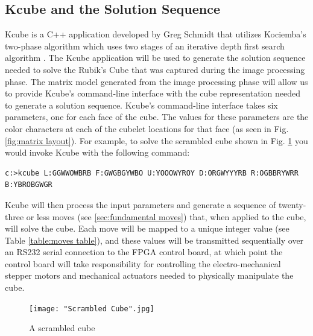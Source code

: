 \documentclass[final, letterpaper, 10 pt, conference, onecolumn]{IEEEtran}
\begin{document}
\subsection{Kcube and the Solution Sequence}
\label{sec:Kcube}
Kcube is a C++ application developed by Greg Schmidt that utilizes Kociemba's two-phase algorithm which uses two stages of an iterative depth first search algorithm \cite{The Two-Phase Algorithm}. The Kcube application will be used to generate the solution sequence needed to solve the Rubik's Cube that was captured during the image processing phase. The matrix model generated from the image processing phase will allow us to provide Kcube's command-line interface with the cube representation needed to generate a solution sequence. Kcube's command-line interface takes six parameters, one for each face of the cube. The values for these parameters are the color characters at each of the cubelet locations for that face (as seen in Fig. \ref{fig:matrix layout}). For example, to solve the scrambled cube shown in Fig. \ref{fig:scrambled cube} you would invoke Kcube with the following command:

\begin{lstlisting}[style=DOS]
c:>kcube L:GGWWOWBRB F:GWGBGYWBO U:YOOOWYROY D:ORGWYYYRB R:OGBBRYWRR B:YBROBGWGR
\end{lstlisting}

Kcube will then process the input parameters and generate a sequence of twenty-three or less moves (see \ref{sec:fundamental moves}) that, when applied to the cube, will solve the cube. Each move will be mapped to a unique integer value (see Table \ref{table:moves table}), and these values will be transmitted sequentially over an RS232 serial connection to the FPGA control board, at which point the control board will take responsibility for controlling the electro-mechanical stepper motors and mechanical actuators needed to physically manipulate the cube.


\begin{figure}[!ht]
\centering
\texttt{[image: "Scrambled Cube".jpg]}
\caption{A scrambled cube}
\label{fig:scrambled cube}
\end{figure}
\end{document}
